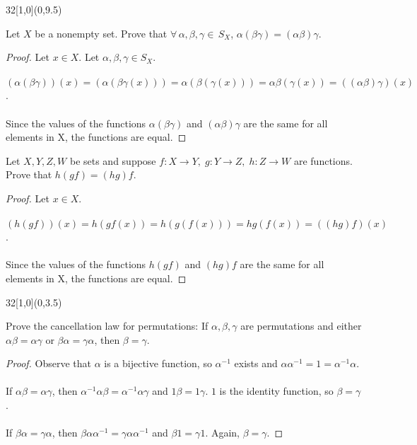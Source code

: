 \documentclass[12pt]{article}
\newenvironment{exercise}[2]{\begin{textblock}{32}[1,0](0,#2)\noindent#1\end{textblock}}{\vspace{1in}}
\begin{document}
\begin{exercise}{1.3}{9.5}
	{\noindent}Let $X$ be a nonempty set. Prove that $\forall\, \alpha, \beta, \gamma\in \, S_X$, $\alpha(\beta\gamma)=(\alpha\beta)\gamma$.
	\bigskip

	\begin{proof}
    Let $x\in X$. Let $\alpha,\beta,\gamma\in S_X$.\\
		\\
		$(\alpha(\beta\gamma))(x) = (\alpha(\beta\gamma(x))) = \alpha(\beta(\gamma(x))) = \alpha\beta(\gamma(x)) = ((\alpha\beta)\gamma)(x)$.\\
		\\
		Since the values of the functions $\alpha(\beta\gamma)$ and $(\alpha\beta)\gamma$ are the same for all elements in X, the functions are equal.
  \end{proof}
	\vspace{1in}

	{\noindent}Let $X,Y,Z,W$ be sets and suppose $f:X\to Y,\; g:Y\to Z,\; h:Z\to W$ are functions. Prove that $h(gf)=(hg)f$.
	\bigskip

	\begin{proof}
		Let $x\in X$.\\
		\\
		$(h(gf))(x) = h(gf(x)) = h(g(f(x))) = hg(f(x)) = ((hg)f)(x)$.\\
		\\
		Since the values of the functions $h(gf)$ and $(hg)f$ are the same for all elements in X, the functions are equal.
	\end{proof}
\end{exercise}


\begin{exercise}{1.6}{3.5}
	{\noindent}Prove the cancellation law for permutations: If $\alpha, \beta, \gamma$ are permutations and either $\alpha\beta=\alpha\gamma$ or $\beta\alpha=\gamma\alpha$, then $\beta=\gamma$.
	\bigskip

	\begin{proof}
		Observe that $\alpha$ is a bijective function, so $\alpha^{-1}$ exists and $\alpha\alpha^{-1} = 1 = \alpha^{-1}\alpha$.
		\\
		\\
		If $\alpha\beta=\alpha\gamma$, then $\alpha^{-1}\alpha\beta=\alpha^{-1}\alpha\gamma$ and $1\beta=1\gamma$. $1$ is the identity function, so $\beta=\gamma$.
		\\
		\\
		If $\beta\alpha=\gamma\alpha$, then $\beta\alpha\alpha^{-1}=\gamma\alpha\alpha^{-1}$ and $\beta 1=\gamma 1$. Again, $\beta=\gamma$.
	\end{proof}
\end{exercise}
\end{document}
